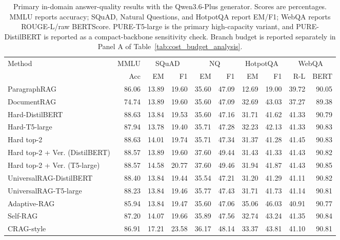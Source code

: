 \documentclass[a4paper,fleqn]{cas-dc}
\begin{document}
\begin{table}[t]
\centering
\scriptsize
\setlength{\tabcolsep}{2.2pt}
\caption{Primary in-domain answer-quality results with the Qwen3.6-Plus generator. Scores are percentages. MMLU reports accuracy; SQuAD, Natural Questions, and HotpotQA report EM/F1; WebQA reports ROUGE-L/raw BERTScore. PURE-T5-large is the primary high-capacity variant, and PURE-DistilBERT is reported as a compact-backbone sensitivity check. Branch budget is reported separately in Panel A of Table~\ref{tab:cost_budget_analysis}.}
\label{tab:main_indomain_results}
\begin{tabular*}{\textwidth}{@{\extracolsep{\fill}}lrrrrrrrrr@{}}
\toprule
Method & MMLU & \multicolumn{2}{c}{SQuAD} & \multicolumn{2}{c}{NQ} & \multicolumn{2}{c}{HotpotQA} & \multicolumn{2}{c}{WebQA} \\
\cmidrule(lr){2-2}\cmidrule(lr){3-4}\cmidrule(lr){5-6}\cmidrule(lr){7-8}\cmidrule(lr){9-10}
 & Acc & EM & F1 & EM & F1 & EM & F1 & R-L & BERT \\
\midrule
ParagraphRAG & 86.06 & 13.89 & 19.60 & 35.60 & 47.09 & 12.69 & 19.00 & 39.72 & 90.05 \\
DocumentRAG & 74.74 & 13.89 & 19.60 & 35.60 & 47.09 & 32.69 & 43.03 & 37.27 & 89.38 \\
\midrule
Hard-DistilBERT & 88.63 & 13.84 & 19.53 & 35.60 & 47.16 & 31.71 & 41.62 & 41.33 & 90.79 \\
Hard-T5-large & 87.94 & 13.78 & 19.40 & 35.71 & 47.28 & 32.23 & 42.13 & 41.33 & 90.83 \\
Hard top-2 & 88.63 & 14.01 & 19.74 & 35.71 & 47.34 & 31.37 & 41.28 & 41.45 & 90.83 \\
Hard top-2 + Ver. (DistilBERT) & 88.57 & 13.89 & 19.60 & 37.60 & 49.44 & 31.43 & 41.33 & 41.43 & 90.82 \\
Hard top-2 + Ver. (T5-large) & 88.57 & 14.58 & 20.77 & 37.60 & 49.46 & 31.94 & 41.87 & 41.43 & 90.85 \\
\midrule
UniversalRAG-DistilBERT & 88.40 & 13.84 & 19.44 & 35.54 & 47.21 & 31.20 & 41.29 & 41.11 & 90.82 \\
UniversalRAG-T5-large & 88.23 & 13.84 & 19.46 & 35.77 & 47.43 & 31.71 & 41.73 & 41.14 & 90.81 \\
Adaptive-RAG & 85.94 & 13.84 & 19.47 & 35.60 & 47.06 & 35.06 & 46.03 & 40.91 & 90.77 \\
Self-RAG & 87.20 & 14.07 & 19.66 & 35.89 & 47.56 & 32.74 & 43.24 & 41.35 & 90.84 \\
CRAG-style & 86.91 & 17.21 & 23.58 & 36.17 & 48.14 & 33.37 & 43.81 & 41.10 & 90.81 \\

\end{tabular*}
\end{table}
\end{document}
